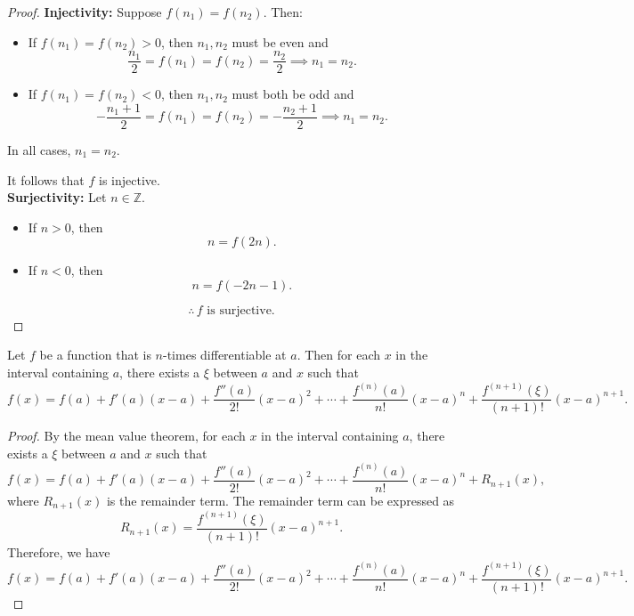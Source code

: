 \documentclass[11pt]{article}
\begin{document}
\begin{proof}
    \textbf{Injectivity:} Suppose $f(n_1) = f(n_2)$. Then:
    \begin{itemize}
        \item If $f(n_1) = f(n_2) > 0$, then $n_1, n_2$ must be even and
              \[
                  \frac{n_1}{2} = f(n_1) = f(n_2) = \frac{n_2}{2} \implies n_1 = n_2.
              \]

        \item If $f(n_1) = f(n_2) < 0$, then $n_1, n_2$ must both be odd and
              \[
                  -\frac{n_1 + 1}{2} = f(n_1) = f(n_2) = -\frac{n_2 + 1}{2} \implies n_1 = n_2.
              \]
    \end{itemize}

    In all cases, $n_1 = n_2$.

    It follows that $f$ is injective. \\ \textbf{Surjectivity:} Let $n \in
        \mathbb{Z}$.

    \begin{itemize}
        \item If $n > 0$, then
              \[
                  n = f(2n).
              \]
        \item If $n < 0$, then
              \[
                  n = f(-2n - 1).
              \]
    \end{itemize}

    \[
        \therefore \, f \text{ is surjective.}
    \]
\end{proof}


    \begin{theorem}
        Let \( f \) be a function that is \( n \)-times differentiable at \( a \). Then for each \( x \) in the interval containing \( a \), there exists a \( \xi \) between \( a \) and \( x \) such that
        \[
            f(x) = f(a) + f'(a)(x - a) + \frac{f''(a)}{2!}(x - a)^2 + \cdots + \frac{f^{(n)}(a)}{n!}(x - a)^n + \frac{f^{(n+1)}(\xi)}{(n+1)!}(x - a)^{n+1}.
        \]
    \end{theorem}

    \begin{proof}
        By the mean value theorem, for each \( x \) in the interval containing \( a \), there exists a \( \xi \) between \( a \) and \( x \) such that
        \[
            f(x) = f(a) + f'(a)(x - a) + \frac{f''(a)}{2!}(x - a)^2 + \cdots + \frac{f^{(n)}(a)}{n!}(x - a)^n + R_{n+1}(x),
        \]
        where \( R_{n+1}(x) \) is the remainder term. The remainder term can be expressed as
        \[
            R_{n+1}(x) = \frac{f^{(n+1)}(\xi)}{(n+1)!}(x - a)^{n+1}.
        \]
        Therefore, we have
        \[
            f(x) = f(a) + f'(a)(x - a) + \frac{f''(a)}{2!}(x - a)^2 + \cdots + \frac{f^{(n)}(a)}{n!}(x - a)^n + \frac{f^{(n+1)}(\xi)}{(n+1)!}(x - a)^{n+1}.
        \]
    \end{proof}
\end{document}

